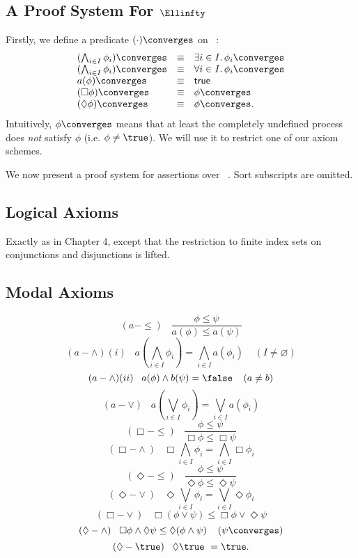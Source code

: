 \subsection*{A Proof System For $\Ellinfty$}
Firstly, we define a predicate $( \cdot ){\converges}$ on \Ellinfty\ :
\[ \begin{array}{lll}
(\bigwedge_{i \in I} \phi_{i} ) {\converges} & \equiv & \exists i \in I . \,
\phi_{i} {\converges} \\
(\bigwedge_{i \in I} \phi_{i} ) {\converges} & \equiv & \forall i \in I . \,
\phi_{i} {\converges} \\
a(\phi ) {\converges} & \equiv & {\sf true} \\
(\Box \phi ) {\converges} & \equiv & \phi {\converges} \\
(\Diamond \phi ) {\converges} & \equiv & \phi {\converges} .
\end{array} \]
Intuitively, $\phi {\converges}$ means that at least the completely
undefined process does {\em not} satisfy $\phi$ (i.e. $\phi \not= \true$).
We will use it to restrict one of our axiom schemes.

We now present a proof system for assertions over \Ellinfty\ .
Sort subscripts are omitted.

\subsection*{Logical Axioms}
Exactly as in Chapter 4, except that the restriction to finite index sets on
conjunctions and disjunctions is lifted.

\subsection*{Modal Axioms}
\begin{center}
\[ (a-{\leq}) \;\;\;  \frac{\phi \leq \psi}{a(\phi ) \leq a(\psi )} \]
\[ (a-{\wedge})(i) \;\;\; a(\bigwedge_{i \in I} \phi_{i} ) = \bigwedge_{i \in
I} a(\phi_{i} ) \;\;\;\; (I \not= \varnothing ) \]
\[ (a-{\wedge})(ii) \;\;\; a(\phi ) \wedge b(\psi ) = \false \;\;\;\; (a \not=
b) \]
\[ (a-{\vee}) \;\;\; a(\bigvee_{i \in I}\phi_{i} ) = \bigvee_{i \in I}
a(\phi_{i})  \]
\[ ({\Box}-{\leq}) \;\;\; \frac{\phi \leq \psi}{\Box \phi \leq \Box \psi} \]
\[ ({\Box}-{\wedge}) \;\;\; \Box \bigwedge_{i \in I} \phi_{i} =
\bigwedge_{i \in I} \Box \phi_{i} \]
\[ ({\Diamond}-{\leq}) \;\;\;  \frac{\phi \leq \psi}{\Diamond \phi \leq
\Diamond \psi} \]
\[ ({\Diamond}-{\vee}) \;\;\; \Diamond \bigvee_{i \in I} \phi_{i} =
\bigvee_{i \in I} \Diamond \phi_{i}  \]
\[ ({\Box}-{\vee}) \;\;\; \Box (\phi \vee \psi ) \leq \Box \phi \vee
\Diamond \psi  \]
\[ ({\Diamond}-{\wedge}) \;\;\;  \Box \phi \wedge \Diamond \psi \leq
\Diamond ( \phi \wedge \psi ) \;\;\;\; ( \psi {\converges}) \]
\[ ({\Diamond}-{\true}) \;\;\; \Diamond \true\ = \true . \]
\end{center}

